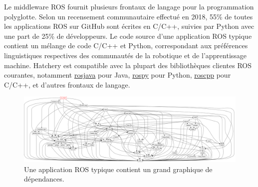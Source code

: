 Le middleware ROS fournit plusieurs frontaux de langage pour la programmation polyglotte. Selon un recensement communautaire effectué en 2018, 55\% de toutes les applications ROS sur GitHub sont écrites en C/C++, suivies par Python avec une part de 25\% de développeurs. Le code source d'une application ROS typique contient un mélange de code C/C++ et Python, correspondant aux préférences linguistiques respectives des communautés de la robotique et de l'apprentissage machine. Hatchery est compatible avec la plupart des bibliothèques clientes ROS courantes, notamment \href{https://wiki.ros.org/rosjava}{rosjava} pour Java, \href{https://wiki.ros.org/rospy}{rospy} pour Python, \href{https://wiki.ros.org/rospy}{roscpp} pour C/C++, et d'autres frontaux de langage.

\begin{figure}
    \centering
    \includegraphics[width=\textwidth]{../figures/rqt_dep_graph.png}
    \caption{Une application ROS typique contient un grand graphique de dépendances.}
\end{figure}

